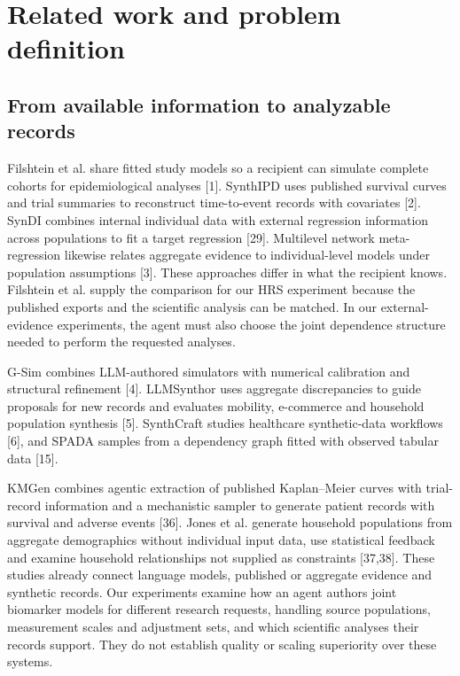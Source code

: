 \documentclass[11pt,letterpaper]{article}
\begin{document}
\section{Related work and problem definition}

\subsection{From available information to analyzable records}

Filshtein et al. share fitted study models so a recipient can simulate complete cohorts for epidemiological analyses [1]. SynthIPD uses published survival curves and trial summaries to reconstruct time-to-event records with covariates [2]. SynDI combines internal individual data with external regression information across populations to fit a target regression [29]. Multilevel network meta-regression likewise relates aggregate evidence to individual-level models under population assumptions [3]. These approaches differ in what the recipient knows. Filshtein et al. supply the comparison for our HRS experiment because the published exports and the scientific analysis can be matched. In our external-evidence experiments, the agent must also choose the joint dependence structure needed to perform the requested analyses.


G-Sim combines LLM-authored simulators with numerical calibration and structural refinement [4]. LLMSynthor uses aggregate discrepancies to guide proposals for new records and evaluates mobility, e-commerce and household population synthesis [5]. SynthCraft studies healthcare synthetic-data workflows [6], and SPADA samples from a dependency graph fitted with observed tabular data [15].


KMGen combines agentic extraction of published Kaplan–\allowbreak{}Meier curves with trial-record information and a mechanistic sampler to generate patient records with survival and adverse events [36]. Jones et al. generate household populations from aggregate demographics without individual input data, use statistical feedback and examine household relationships not supplied as constraints [37,38]. These studies already connect language models, published or aggregate evidence and synthetic records. Our experiments examine how an agent authors joint biomarker models for different research requests, handling source populations, measurement scales and adjustment sets, and which scientific analyses their records support. They do not establish quality or scaling superiority over these systems.
\end{document}

